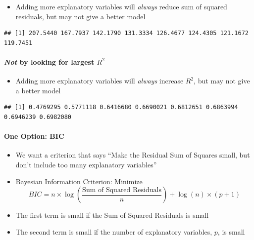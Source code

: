 \documentclass[landscape]{article}
\newenvironment{Shaded}{\begin{snugshade}}{\end{snugshade}}
\newcommand{\KeywordTok}[1]{\textcolor[rgb]{0.13,0.29,0.53}{\textbf{#1}}}
\newcommand{\OperatorTok}[1]{\textcolor[rgb]{0.81,0.36,0.00}{\textbf{#1}}}
\newcommand{\NormalTok}[1]{#1}
\providecommand{\tightlist}{%
  \setlength{\itemsep}{0pt}\setlength{\parskip}{0pt}}
\let\oldparagraph\paragraph
\renewcommand{\paragraph}[1]{\oldparagraph{#1}\mbox{}}
\begin{document}
\begin{itemize}
\tightlist
\item
  Adding more explanatory variables will \emph{always} reduce sum of
  squared residuals, but may not give a better model
\end{itemize}

\begin{Shaded}
\end{Shaded}

\begin{verbatim}
## [1] 207.5440 167.7937 142.1790 131.3334 126.4677 124.4305 121.1672 119.7451
\end{verbatim}

\paragraph{\texorpdfstring{\emph{Not} by looking for largest
\(R^2\)}{Not by looking for largest R\^{}2}}\label{not-by-looking-for-largest-r2}

\begin{itemize}
\tightlist
\item
  Adding more explanatory variables will \emph{always} increase \(R^2\),
  but may not give a better model
\end{itemize}

\begin{Shaded}
\end{Shaded}

\begin{verbatim}
## [1] 0.4769295 0.5771118 0.6416680 0.6690021 0.6812651 0.6863994 0.6946239 0.6982080
\end{verbatim}

\paragraph{One Option: BIC}\label{one-option-bic}

\begin{itemize}
\tightlist
\item
  We want a criterion that says ``Make the Residual Sum of Squares
  small, but don't include too many explanatory variables''
\item
  Bayesian Information Criterion: Minimize
  \[BIC = n \times \log\left( \frac{\text{Sum of Squared Residuals}}{n} \right) + \log(n) \times (p + 1)\]
\item
  The first term is small if the Sum of Squared Residuals is small
\item
  The second term is small if the number of explanatory variables,
  \(p\), is small
\end{itemize}
\end{document}
